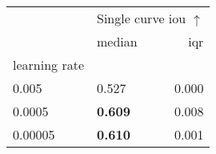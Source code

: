 \begin{tabular}{llr}
\toprule
 & \multicolumn{2}{c}{Single curve \acrshort{iou} $\uparrow$} \\
 & median & \acrshort{iqr} \\
learning rate &  &  \\
\midrule
0.005 & 0.527 & 0.000 \\
0.0005 & \textbf{0.609} & 0.008 \\
0.00005 & \textbf{0.610} & 0.001 \\
\bottomrule
\end{tabular}
